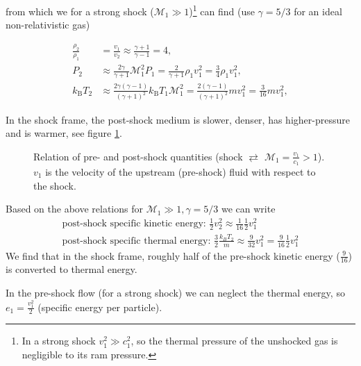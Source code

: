 from which we for a strong shock ($\mathcal{M}_1 \gg 1$)\footnote{In a strong shock $v_1^2 \gg c_1^2$, so the thermal pressure of the unshocked gas is negligible to its ram pressure.} can find (use $\gamma = 5 / 3$ for an ideal non-relativistic gas)

\begin{equation}
    \begin{aligned}
    \frac{\rho_2}{\rho_1} & =\frac{v_1}{v_2} \approx \frac{\gamma+1}{\gamma-1}=4, \\
    P_2 & \approx \frac{2 \gamma}{\gamma+1} \mathcal{M}_1^2 P_1=\frac{2}{\gamma+1} \rho_1 v_1^2=\frac{3}{4} \rho_1 v_1^2, \\
    k_{\mathrm{B}} T_2 & \approx \frac{2 \gamma(\gamma-1)}{(\gamma+1)^2} k_{\mathrm{B}} T_1 \mathcal{M}_1^2=\frac{2(\gamma-1)}{(\gamma+1)^2} m v_1^2=\frac{3}{16} m v_1^2,
    \end{aligned}
\end{equation}

In the shock frame, the post-shock medium is slower, denser, has higher-pressure and is warmer, see figure \ref{fig:shock_mach}.

\begin{figure}[!htb]
    \centering
    
    \caption{Relation of pre- and post-shock quantities (shock $\rightleftarrows$ $\mathcal{M}_1 = \frac{v_1}{c_1}> 1$). $v_1$ is the velocity of the upstream (pre-shock) fluid with respect to the shock.}
    \label{fig:shock_mach}
\end{figure}

Based on the above relations for $\mathcal{M}_1 \gg 1, \gamma = 5/3$ we can write
\begin{equation}
    \begin{gathered}
        \text{post-shock specific kinetic energy: } \frac{1}{2} v_2^2 \approx \frac{1}{16} \frac{1}{2} v_1^2 \\
        \text{post-shock specific thermal energy: } \frac{3}{2} \frac{k_B T_2}{m} \approx \frac{9}{32} v_1^2 = \frac{9}{16} \frac{1}{2} v_1^2
    \end{gathered}
\end{equation}
We find that in the shock frame, roughly half of the pre-shock kinetic energy ($\frac{9}{16}$) is converted to thermal energy.

In the pre-shock flow (for a strong shock) we can neglect the thermal energy, so $e_1 = \frac{v_1^2}{2}$ (specific energy per particle).

